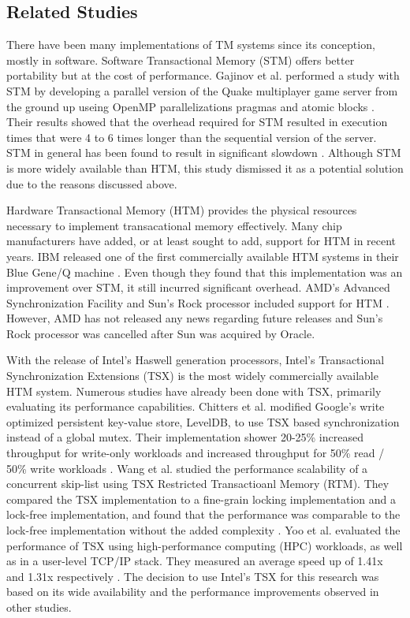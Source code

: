\documentclass[a4paper]{article}
\begin{document}
\subsection{\textbf{Related Studies}}

\indent 
There have been many implementations of TM systems since its conception, mostly
in software.  Software Transactional Memory (STM) offers better portability but
at the cost of performance.  Gajinov et al. performed a study with STM by
developing a parallel version of the Quake multiplayer game server from the
ground up useing OpenMP parallelizations pragmas and atomic blocks
\cite{quake_stm}.  Their results showed that the overhead required for STM
resulted in execution times that were 4 to 6 times longer than the sequential
version of the server.  STM in general has been found to result in significant
slowdown \cite{stm_cascaval}.  Although STM is more widely available than HTM,
this study dismissed it as a potential solution due to the reasons discussed
above.
\par

\indent 
Hardware Transactional Memory (HTM) provides the physical resources
necessary to implement transacational memory effectively.  Many chip manufacturers
have added, or at least sought to add, support for HTM in recent years.  IBM
released one of the first commercially available HTM systems in their Blue
Gene/Q machine \cite{blue_wang}.  Even though they found that this
implementation was an improvement over STM, it still incurred significant
overhead.  AMD's Advanced Synchronization Facility and Sun's Rock processor
included support for HTM \cite{chung_amd,rock_dice}.  However, AMD has not
released any news regarding future releases and Sun's Rock processor was
cancelled after Sun was acquired by Oracle.
\par

\indent 
With the release of Intel's Haswell generation processors, Intel's
Transactional Synchronization Extensions (TSX) is the most widely commercially
available HTM system.  Numerous studies have already been done with TSX,
primarily evaluating its performance capabilities.  Chitters et al. modified
Google's write optimized persistent key-value store, LevelDB, to use TSX based
synchronization instead of a global mutex.  Their implementation shower 20-25\%
increased throughput for write-only workloads and increased throughput for 50\%
read / 50\% write workloads \cite{chitters_tsx}.  Wang et al. studied the
performance scalability of a concurrent skip-list using TSX Restricted
Transactioanl Memory (RTM).  They compared the TSX implementation to a
fine-grain locking implementation and a lock-free implementation, and found that
the performance was comparable to the lock-free implementation without the added
complexity \cite{wang_tsx}.  Yoo et al. evaluated the performance of TSX using
high-performance computing (HPC) workloads, as well as in a user-level TCP/IP
stack.  They measured an average speed up of 1.41x and 1.31x respectively
\cite{yoo_tsx}.  The decision to use Intel's TSX for this research was based on
its wide availability and the performance improvements observed in other
studies.
\par
\end{document}
